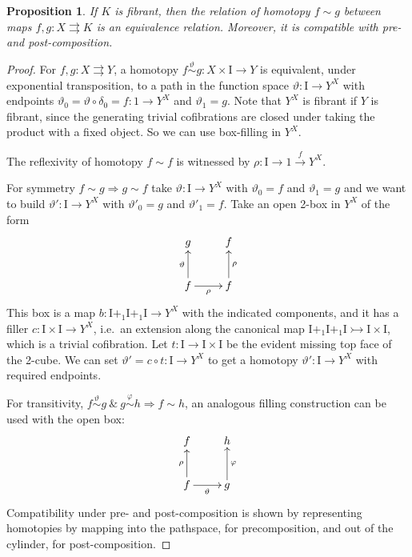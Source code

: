 \documentclass[12pt]{article}
\newcommand{\mono}{\ensuremath{\rightarrowtail}}
\newcommand{\ra}{\ensuremath{\rightarrow}}
\newcommand{\I}{\ensuremath{\mathrm{I}}}
\newtheorem{proposition}[theorem]{Proposition}
\theoremstyle{remark}
\theoremstyle{definition}
\begin{document}
\begin{proposition}
If $K$ is fibrant, then the relation of homotopy $f \sim g$ between maps $f,g: X\rightrightarrows K$ is an equivalence relation.  Moreover, it is compatible with pre- and post-composition. 
\end{proposition}
\begin{proof}
For $f, g: X\rightrightarrows Y$, a homotopy $f\stackrel{\vartheta}{\sim} g : X\times\I \ra Y$ is equivalent, under exponential transposition, to a path in the function space $\vartheta : \I\ra Y^X$ with endpoints $\vartheta_0 = \vartheta\circ\delta_0 = f: 1\ra Y^X$ and $\vartheta_1 = g$.  Note that $Y^X$ is fibrant if $Y$ is fibrant, since the generating trivial cofibrations are closed under taking the product with a fixed object.  So we can use box-filling in $Y^X$.    

The reflexivity of homotopy $f\sim f$ is witnessed by $\rho:\I \ra 1 \stackrel{f}{\ra} Y^X$.  

For symmetry $f\sim g\Rightarrow g\sim f$ take $\vartheta : \I\ra Y^X$ with $\vartheta_0 = f$ and $\vartheta_1 = g$ and we want to build $\vartheta' : \I\ra Y^X$ with $\vartheta'_0 = g$ and $\vartheta'_1 = f$. Take an open 2-box in $Y^X$ of the form
\begin{equation*}%
\xymatrix{
g  & f  \\
f \ar[u]^{\vartheta} \ar[r]_\rho & f \ar[u]_\rho
}
\end{equation*}
This box is a map $b : \I+_1 \I +_1 \I \ra Y^X$ with the indicated components, and it has a filler $c : \I\times \I \ra Y^X$, i.e.\ an extension along the canonical map $\I+_1 \I +_1 \I \mono \I\times\I$, which is a trivial cofibration.  Let $t : \I\ra \I\times\I$ be the evident missing top face of the 2-cube.  We can set $\vartheta' = c\circ t : \I \ra Y^X$ to get a homotopy $\vartheta' : \I\ra Y^X$ with required endpoints.

For transitivity, $f\stackrel{\vartheta}{\sim} g\ \&\ g\stackrel{\varphi}{\sim} h\Rightarrow f\sim h$, an analogous filling construction can be used with the open box:
\begin{equation*}%
\xymatrix{
f  & h  \\
f \ar[u]^{\rho} \ar[r]_\vartheta & g \ar[u]_\varphi
}
\end{equation*}
Compatibility under pre- and post-composition is shown by representing homotopies by mapping into the pathspace, for precomposition, and out of the cylinder, for post-composition.
\end{proof}
\end{document}
